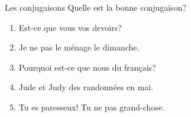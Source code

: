 \begin{frame}{Les conjugaisons}
  Quelle est la bonne conjugaison? \\
  \begin{enumerate}
    \item Est-ce que vous \underline{} vos devoirs?
    \item Je ne \underline{} pas le ménage le dimanche.
    \item Pourquoi est-ce que nous \underline{} du français?
    \item Jude et Judy \underline{} des randonnées en mai.
    \item Tu es paresseux! Tu ne \underline{} pas grand-chose.
  \end{enumerate}
\end{frame}